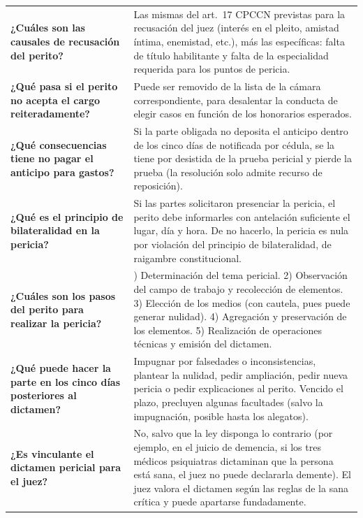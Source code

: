 \documentclass[12pt,oneside]{book}
\begin{document}
\begin{longtable}{
    >{\raggedright\arraybackslash}p{}
    >{\raggedright\arraybackslash}p{}
}
\textbf{¿Cuáles son las causales de recusación del perito?} &
Las mismas del art.\ 17 CPCCN previstas para la recusación del juez (interés en el pleito, amistad íntima, enemistad, etc.), más las específicas: falta de título habilitante y falta de la especialidad requerida para los puntos de pericia. \\

\textbf{¿Qué pasa si el perito no acepta el cargo reiteradamente?} &
Puede ser removido de la lista de la cámara correspondiente, para desalentar la conducta de elegir casos en función de los honorarios esperados. \\

\textbf{¿Qué consecuencias tiene no pagar el anticipo para gastos?} &
Si la parte obligada no deposita el anticipo dentro de los cinco días de notificada por cédula, se la tiene por desistida de la prueba pericial y pierde la prueba (la resolución solo admite recurso de reposición). \\

\textbf{¿Qué es el principio de bilateralidad en la pericia?} &
Si las partes solicitaron presenciar la pericia, el perito debe informarles con antelación suficiente el lugar, día y hora. De no hacerlo, la pericia es nula por violación del principio de bilateralidad, de raigambre constitucional. \\

\textbf{¿Cuáles son los pasos del perito para realizar la pericia?} &
1) Determinación del tema pericial. 2) Observación del campo de trabajo y recolección de elementos. 3) Elección de los medios (con cautela, pues puede generar nulidad). 4) Agregación y preservación de los elementos. 5) Realización de operaciones técnicas y emisión del dictamen. \\

\textbf{¿Qué puede hacer la parte en los cinco días posteriores al dictamen?} &
Impugnar por falsedades o inconsistencias, plantear la nulidad, pedir ampliación, pedir nueva pericia o pedir explicaciones al perito. Vencido el plazo, precluyen algunas facultades (salvo la impugnación, posible hasta los alegatos). \\

\textbf{¿Es vinculante el dictamen pericial para el juez?} &
No, salvo que la ley disponga lo contrario (por ejemplo, en el juicio de demencia, si los tres médicos psiquiatras dictaminan que la persona está sana, el juez no puede declararla demente). El juez valora el dictamen según las reglas de la sana crítica y puede apartarse fundadamente. \\


\end{longtable}
\end{document}
